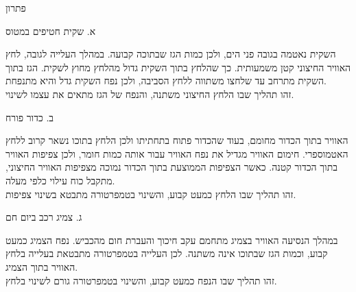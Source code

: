 \documentclass[
  hebrew,
  letterpaper,
  DIV=11,
  numbers=noendperiod]{scrreprt}
\begin{document}
פתרון

א. שקית חטיפים במטוס

השקית נאטמה בגובה פני הים, ולכן כמות הגז שבתוכה קבועה. במהלך העלייה
לגובה, לחץ האוויר החיצוני קטן משמעותית. כך שהלחץ בתוך השקית גדול מהלחץ
מחוץ לשקית. הגז בתוך השקית מתרחב עד שלחצו משתווה ללחץ הסביבה, ולכן נפח
השקית גדל והיא מתנפחת.\\
זהו תהליך שבו הלחץ החיצוני משתנה, והנפח של הגז מתאים את עצמו לשינוי.

ב. כדור פורח

האוויר בתוך הכדור מחומם, בעוד שהכדור פתוח בתחתיתו ולכן הלחץ בתוכו נשאר
קרוב ללחץ האטמוספרי. חימום האוויר מגדיל את נפח האוויר עבור אותה כמות
חומר, ולכן צפיפות האוויר בתוך הכדור קטנה. כאשר הצפיפות הממוצעת בתוך
הכדור נמוכה מצפיפות האוויר החיצוני, מתקבל כוח עילוי כלפי מעלה.\\
זהו תהליך שבו הלחץ כמעט קבוע, והשינוי בטמפרטורה מתבטא בשינוי צפיפות.

ג. צמיג רכב ביום חם

במהלך הנסיעה האוויר בצמיג מתחמם עקב חיכוך והעברת חום מהכביש. נפח הצמיג
כמעט קבוע, וכמות הגז שבתוכו אינה משתנה. לכן העלייה בטמפרטורה מתבטאת
בעלייה בלחץ האוויר בתוך הצמיג.\\
זהו תהליך שבו הנפח כמעט קבוע, והשינוי בטמפרטורה גורם לשינוי בלחץ.
\end{document}
